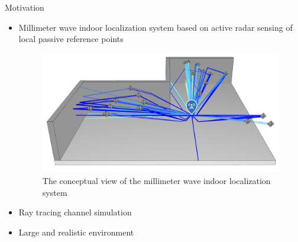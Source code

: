 \documentclass{beamer}
\begin{document}

\begin{frame}[t,plain]
	\titlepage
\end{frame}


\begin{frame}[t]{Motivation}
	\begin{itemize}
	    \item Millimeter wave indoor localization system based on active radar sensing of local passive reference points \cite{schlachter_indoor_2024}
            \begin{figure}
            	\centering
            	\includegraphics[scale=.28]{figures/thesis_plot.png}
            	\caption{The conceptual view of the millimeter wave indoor localization system}
            \end{figure}
        \item Ray tracing channel simulation
        \item Large and realistic environment
	\end{itemize}
\end{frame}
\end{document}
